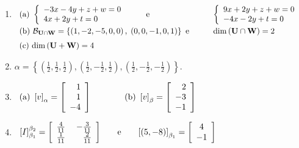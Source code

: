 \documentclass{report}
\renewcommand{\dim}{{\rm dim}}           %
\begin{document}
\begin{enumerate}
\item  $
\begin{array}[t]{ll}
\text{(a) }\left\{
\begin{array}{l}
-3x-4y+z+w=0 \\
4x+2y+t=0
\end{array}
\right. \qquad \text{ e} & \qquad \left\{
\begin{array}{l}
9x+2y+z+w=0 \\
-4x-2y+t=0
\end{array}
\right. \smallskip  \\
\text{(b) }\mathcal{B}_{\mathbf{U}\cap \mathbf{W}}=\left\{ \left(
1,-2,-5,0,0\right) ,\;\left( 0,0,-1,0,1\right) \right\} \text{ e} & \qquad
\dim \left( \mathbf{U}\cap \mathbf{W}\right) =2\smallskip \smallskip  \\
\text{(c) }\dim \left( \mathbf{U}+\mathbf{W}\right) =4 &
\end{array}
\qquad \,$\newline

\item  $\alpha =\left\{ \left( \frac{1}{2},\frac{1}{2},\frac{1}{2}\right)
,\left( \frac{1}{2},-\frac{1}{2},\frac{1}{2}\right) ,\left( \frac{1}{2},-%
\frac{1}{2},-\frac{1}{2}\right) \right\} .$

\item  $
\begin{array}[t]{lllll}
\text{(a) }\left[ v\right] _{\alpha }=\left[
\begin{array}{r}
1 \\
1 \\
-4
\end{array}
\right]  &  &  &  & \text{(b) }\left[ v\right] _{\beta }=\left[
\begin{array}{r}
2 \\
-3 \\
-1
\end{array}
\right]
\end{array}
\qquad $

\item  $
\begin{array}[t]{lllll}
\left[ I\right] _{\beta _{1}}^{\beta _{2}}=\left[
\begin{array}{rr}
\frac{4}{11} & \;-\frac{3}{11} \\
\frac{1}{11} & \frac{2}{11}
\end{array}
\right]  &  & \text{e} &  & \left[ \left( 5,-8\right) \right] _{\beta
_{1}}=\left[
\begin{array}{c}
4 \\
-1
\end{array}
\right]
\end{array}
$


\end{enumerate}
\end{document}

